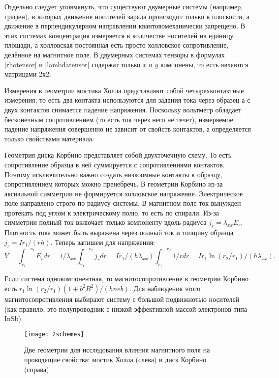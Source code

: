 Отдельно следует упоямянуть, что существуют двумерные системы (например, графен), в которых движение носителей заряда происходит только в плоскости, а движение в перпендикулярном направлении квантовомеханически запрещено. В этих системах концентрация измеряется в количестве носителей на единицу площади, а холловская постоянная есть просто холловское сопротивление, делённое на магнитное поле. В двумерных системах тензоры в формулах \ref{rhotensor} и \ref{lambdatensor} содержат только $x$ и $y$ компонены, то есть являются матрицами 2х2.

Измерения в геометрии мостика Холла представляют собой четырехконтактные измерения, то есть два контакта используются для задания тока через образец а с двух контактов снимается падение напряжения. Поскольку вольтметр обладает бесконечным сопротивлением (то есть ток через него не течет), измеряемое падение напряжения совершенно не зависит от свойств контактов, а определяется только свойствами материала.

Геометрия диска Корбино представляет собой двухточечную схему. То есть сопротивление образца в ней суммируется с сопротивлениями контактов. Поэтому исключительно важно создать низкоомные контакты к образцу, сопротивлением которых можно пренебречь. В геометрии Корбино из-за аксиальной симметрии не формируется холловское напряжение. Электрическое поле направлено строго по радиусу системы. В магнитном поле ток вынужден протекать под углом к электрическому полю, то есть по спирали. Из-за симметрии полный ток включает только компоненту вдоль радиуса $j_r=\lambda_{xx} E_r$. Плотность тока может быть выражена через полный ток и толщину образца $j_r=Ir_1/(rh)$. Теперь запишем для напряжения:
$$V={\int_{r_1}}^{r_2}E_r dr=1/\lambda_{xx}{\int_{r_1}}^{r_2}j_r dr=Ir_1/(h\lambda_{xx}){\int_{r_1}}^{r_2}1/r dr=Ir_1\ln(r_2/r_1)/(h\lambda_{xx}).$$

Если система однокомпонентная, то магнитосопротивление в геометрии Корбино есть $r_1\ln(r_2/r_1)(1+b^2B^2)/(hneb)$. Для наблюдения этого магнитосопротивления выбирают систему с большой подвижнотью носителей (как правило, это полупроводник с низкой эффективной массой электронов типа InSb)

\begin{figure}
	\texttt{[image: 2schemes]}
	\caption{Две геометрии для исследования влияния магнитного поля на проводящие свойства: мостик Холла (слева) и диск Корбино (справа).}
	\label{fig2}
\end{figure}




